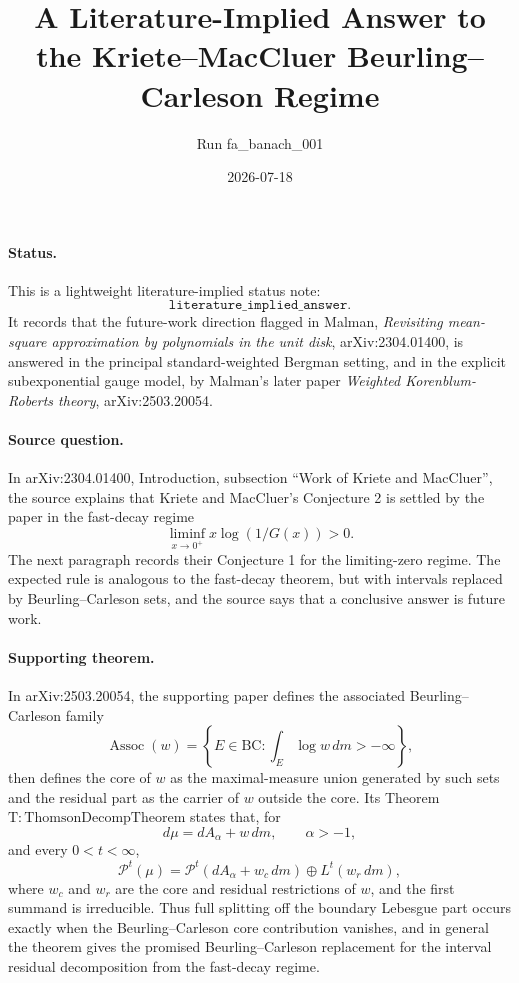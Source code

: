 \documentclass[11pt]{article}
\title{A Literature-Implied Answer to the Kriete--MacCluer Beurling--Carleson Regime}
\author{Run fa\_banach\_001}
\date{2026-07-18}
\newcommand{\Po}{\mathcal P}
\newcommand{\BC}{\mathrm{BC}}
\begin{document}
\maketitle

\paragraph{Status.}
This is a lightweight literature-implied status note:
\[
\texttt{literature\_implied\_answer.}
\]
It records that the future-work direction flagged in Malman,
\emph{Revisiting mean-square approximation by polynomials in the unit disk},
arXiv:2304.01400, is answered in the principal standard-weighted Bergman
setting, and in the explicit subexponential gauge model, by Malman's later
paper \emph{Weighted Korenblum-Roberts theory}, arXiv:2503.20054.

\paragraph{Source question.}
In arXiv:2304.01400, Introduction, subsection ``Work of Kriete and
MacCluer'', the source explains that Kriete and MacCluer's Conjecture 2 is
settled by the paper in the fast-decay regime
\[
\liminf_{x\to 0^+} x\log(1/G(x))>0.
\]
The next paragraph records their Conjecture 1 for the limiting-zero regime.
The expected rule is analogous to the fast-decay theorem, but with intervals
replaced by Beurling--Carleson sets, and the source says that a conclusive
answer is future work.

\paragraph{Supporting theorem.}
In arXiv:2503.20054, the supporting paper defines the associated
Beurling--Carleson family
\[
\operatorname{Assoc}(w)
 =\left\{E\in \BC:\int_E \log w\,dm>-\infty\right\},
\]
then defines the core of \(w\) as the maximal-measure union generated by such
sets and the residual part as the carrier of \(w\) outside the core.  Its
Theorem~\(\mathrm{T{:}ThomsonDecompTheorem}\) states that, for
\[
d\mu=dA_\alpha+w\,dm,\qquad \alpha>-1,
\]
and every \(0<t<\infty\),
\[
\Po^t(\mu)=
\Po^t(dA_\alpha+w_c\,dm)\oplus L^t(w_r\,dm),
\]
where \(w_c\) and \(w_r\) are the core and residual restrictions of \(w\), and
the first summand is irreducible.  Thus full splitting off the boundary
Lebesgue part occurs exactly when the Beurling--Carleson core contribution
vanishes, and in general the theorem gives the promised Beurling--Carleson
replacement for the interval residual decomposition from the fast-decay
regime.
\end{document}
